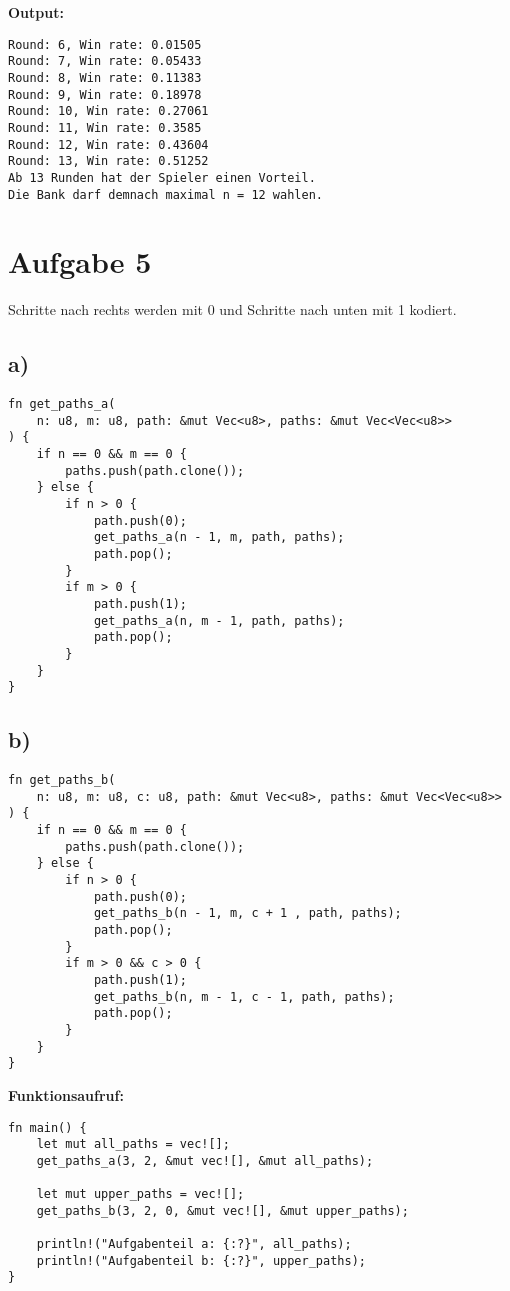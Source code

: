 \documentclass[a4paper]{scrartcl}
\begin{document}
\textbf{Output:}
\begin{lstlisting}
Round: 6, Win rate: 0.01505
Round: 7, Win rate: 0.05433
Round: 8, Win rate: 0.11383
Round: 9, Win rate: 0.18978
Round: 10, Win rate: 0.27061
Round: 11, Win rate: 0.3585
Round: 12, Win rate: 0.43604
Round: 13, Win rate: 0.51252
Ab 13 Runden hat der Spieler einen Vorteil. 
Die Bank darf demnach maximal n = 12 wahlen.
\end{lstlisting}

\section*{Aufgabe 5}
Schritte nach rechts werden mit 0 und Schritte nach unten mit 1 kodiert.
\subsection*{a)}
\begin{lstlisting}
fn get_paths_a(
    n: u8, m: u8, path: &mut Vec<u8>, paths: &mut Vec<Vec<u8>>
) {
    if n == 0 && m == 0 {
        paths.push(path.clone());
    } else {
        if n > 0 {
            path.push(0);
            get_paths_a(n - 1, m, path, paths);
            path.pop();
        }
        if m > 0 {
            path.push(1);
            get_paths_a(n, m - 1, path, paths);
            path.pop();
        }
    }
}
\end{lstlisting}

\newpage
\subsection*{b)}
\begin{lstlisting}
fn get_paths_b(
    n: u8, m: u8, c: u8, path: &mut Vec<u8>, paths: &mut Vec<Vec<u8>>
) {
    if n == 0 && m == 0 {
        paths.push(path.clone());
    } else {
        if n > 0 {
            path.push(0);
            get_paths_b(n - 1, m, c + 1 , path, paths);
            path.pop();
        }
        if m > 0 && c > 0 {
            path.push(1);
            get_paths_b(n, m - 1, c - 1, path, paths);
            path.pop();
        }
    }
}
\end{lstlisting}    

\textbf{Funktionsaufruf:}
\begin{lstlisting}
fn main() {
    let mut all_paths = vec![];
    get_paths_a(3, 2, &mut vec![], &mut all_paths);

    let mut upper_paths = vec![];
    get_paths_b(3, 2, 0, &mut vec![], &mut upper_paths);

    println!("Aufgabenteil a: {:?}", all_paths);
    println!("Aufgabenteil b: {:?}", upper_paths);
}
\end{lstlisting}
\end{document}

